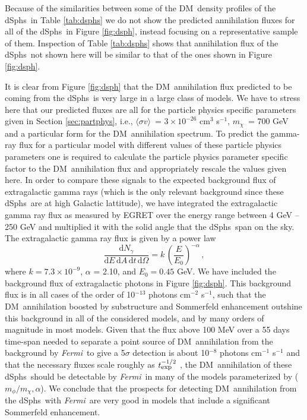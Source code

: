\documentclass[aps,prd,twocolumn,amsmath,amssymb,floatfix,nofootinbib,10pt]{revtex4}
\newcommand{\ie}{i.e.}
\newcommand{\Fermi}{\emph{Fermi}}
\newcommand{\DM}{DM}
\newcommand{\mdm}{\ensuremath{m_{\chi}}}
\newcommand{\mv}{\ensuremath{m_{\phi}}}
\newcommand{\dd}{\mathrm{d}}
\newcommand{\Ngamma}{\ensuremath{N_{\gamma}}}
\newcommand{\sigmaannv}{\ensuremath{\langle\sigma v\rangle}}
\newcommand{\dSphs}{dSphs}
\begin{document}
Because of the similarities between some of the \DM\ density profiles
of the \dSphs\ in Table \ref{tab:dsphs} we do not show the predicted
annihilation fluxes for all of the \dSphs\ in Figure \ref{fig:dsph},
instead focusing on a representative sample of them. Inspection of
Table \ref{tab:dsphs} shows that annihilation flux of the \dSphs\ not
shown here will be similar to that of the ones shown in Figure
\ref{fig:dsph}.




It is clear from Figure \ref{fig:dsph} that the \DM\ annihilation flux
predicted to be coming from the \dSphs\ is very large in a large class
of models. We have to stress here that our predicted fluxes are all
for the particle physics specific parameters given in Section
\ref{sec:partphys}, \ie, \sigmaannv\ = $3 \times 10^{-26}$ cm$^3$
s$^{-1}$, \mdm\ = 700 GeV and a particular form for the \DM\
annihilation spectrum. To predict the gamma-ray flux for a particular
model with different values of these particle physics parameters one
is required to calculate the particle physics parameter specific
factor to the \DM\ annihilation flux and appropriately rescale the
values given here. In order to compare these signals to the expected
background flux of extragalactic gamma rays (which is the only
relevant background since these \dSphs\ are at high Galactic
lattitude), we have integrated the extragalactic gamma ray flux as
measured by EGRET over the energy range between 4 GeV -- 250 GeV and
multiplied it with the solid angle that the \dSphs\ span on the
sky. The extragalactic gamma ray flux is given by a power law
\cite{1998ApJ...494..523S}
\begin{equation}
\frac{\dd \Ngamma}{\dd E \,\dd A \, \dd t\,\dd \Omega} = k\,\left(\frac{E}{E_0}\right)^{-\alpha}\, ,
\end{equation}
where $k = 7.3 \times 10^{-9}$, $\alpha$ = 2.10, and $E_0 = 0.45$
GeV. We have included the background flux of extragalactic photons in
Figure \ref{fig:dsph}. This background flux is in all cases of the
order of 10$^{-13}$ photons cm$^{-2}$ s$^{-1}$, such that the \DM\
annihilation boosted by substructure and Sommerfeld enhancement
outshine this background in all of the considered models, and by many
orders of magnitude in most models. Given that the flux above 100 MeV
over a 55 days time-span needed to separate a point source of \DM\
annihilation from the background by \Fermi\ to give a 5$\sigma$
detection is about 10$^{-8}$ photons cm$^{-1}$ s$^{-1}$ and that the
necessary fluxes scale roughly as $t_{\mbox{{\footnotesize
exp}}}^{-1/2}$ \cite{2008JCAP...07..013B}, the \DM\ annihilation of
these \dSphs\ should be detectable by \Fermi\ in many of the models
parameterized by ($\mv/\mdm,\alpha$). We conclude that the prospects
for detecting \DM\ annihilation from the \dSphs\ with \Fermi\ are very
good in models that include a significant Sommerfeld enhancement.
\end{document}
